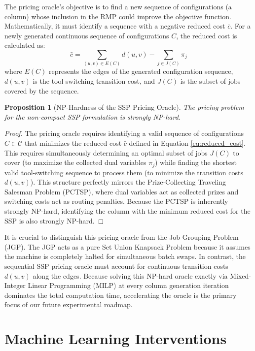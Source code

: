 \documentclass[12pt]{article}
\newtheorem{proposition}{Proposition}[section]
\begin{document}
	The pricing oracle's objective is to find a new sequence of configurations (a column) whose inclusion in the RMP could improve the objective function. Mathematically, it must identify a sequence with a negative reduced cost $\bar{c}$. For a newly generated continuous sequence of configurations $C$, the reduced cost is calculated as:
	\begin{equation} \label{eq:reduced_cost}
		\bar{c} = \sum_{(u,v) \in E(C)} d(u,v) - \sum_{j \in J(C)} \pi_j
	\end{equation}
	where $E(C)$ represents the edges of the generated configuration sequence, $d(u,v)$ is the tool switching transition cost, and $J(C)$ is the subset of jobs covered by the sequence.
	
	\begin{proposition}[NP-Hardness of the SSP Pricing Oracle]
		The pricing problem for the non-compact SSP formulation is strongly NP-hard.
	\end{proposition}
	\begin{proof}
		The pricing oracle requires identifying a valid sequence of configurations $C \in \mathcal{C}$ that minimizes the reduced cost $\bar{c}$ defined in Equation \eqref{eq:reduced_cost}. This requires simultaneously determining an optimal subset of jobs $J(C)$ to cover (to maximize the collected dual variables $\pi_j$) while finding the shortest valid tool-switching sequence to process them (to minimize the transition costs $d(u,v)$). This structure perfectly mirrors the Prize-Collecting Traveling Salesman Problem (PCTSP), where dual variables act as collected prizes and switching costs act as routing penalties. Because the PCTSP is inherently strongly NP-hard, identifying the column with the minimum reduced cost for the SSP is also strongly NP-hard.
	\end{proof}
	
	It is crucial to distinguish this pricing oracle from the Job Grouping Problem (JGP). The JGP acts as a pure Set Union Knapsack Problem because it assumes the machine is completely halted for simultaneous batch swaps. In contrast, the sequential SSP pricing oracle must account for continuous transition costs $d(u,v)$ along the edges. Because solving this NP-hard oracle exactly via Mixed-Integer Linear Programming (MILP) at every column generation iteration dominates the total computation time, accelerating the oracle is the primary focus of our future experimental roadmap.
	
	\section{Machine Learning Interventions}
	
\end{document}
